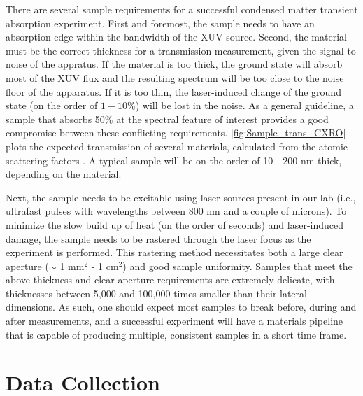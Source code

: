 There are several sample requirements for a successful condensed matter transient absorption experiment. First and foremost, the sample needs to have an absorption edge within the bandwidth of the XUV source. Second, the material must be the correct thickness for a transmission measurement, given the signal to noise of the appratus. If the material is too thick, the ground state will absorb most of the XUV flux and the resulting spectrum will be too close to the noise floor of the apparatus. If it is too thin, the laser-induced change of the ground state (on the order of $1-10\%$) will be lost in the noise. As a general guideline, a sample that absorbs 50\% at the spectral feature of interest provides a good compromise between these conflicting requirements. \cref{fig:Sample_trans_CXRO} plots the expected transmission of several materials, calculated from the atomic scattering factors \cite{gulliksonCXROXRayInteractions}. A typical sample will be on the order of 10 - 200 nm thick, depending on the material.

Next, the sample needs to be excitable using laser sources present in our lab (i.e., ultrafast pulses with wavelengths between 800 nm and a couple of microns). To minimize the slow build up of heat (on the order of seconds) and laser-induced damage, the sample needs to be rastered through the laser focus as the experiment is performed. This rastering method necessitates both a large clear aperture ($\sim$ 1 mm$^2$ - 1 cm$^2$) and good sample uniformity. Samples that meet the above thickness and clear aperture requirements are extremely delicate, with thicknesses between 5,000 and 100,000 times smaller than their lateral dimensions. As such, one should expect most samples to break before, during and after measurements, and a successful experiment will have a materials pipeline that is capable of producing multiple, consistent samples in a short time frame.

\section{Data Collection}

